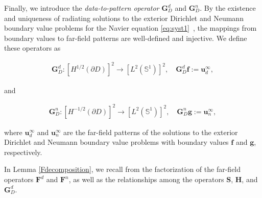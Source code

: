 \documentclass[11pt,reqno,twoside]{amsart}
\theoremstyle{definition}
\theoremstyle{remark}
\numberwithin{equation}{section}
\begin{document}
Finally, we introduce the \emph{data-to-pattern operator} $\mathbf{G}_D^d$ and $\mathbf{G}_D^n$. By the existence and uniqueness of radiating solutions to the exterior Dirichlet and Neumann boundary value problems for the Navier equation \eqref{eq:syst1}~\cite{HH93}, the mappings from boundary values to far-field patterns are well-defined and injective. We define these operators as

\begin{align}\label{eq:DatatoPatternOperatorD}
	\mathbf{G}_D^d : \left[H^{1/2}\left(\partial D\right)\right]^2 \to \left[L^2\left(\mathbb{S}^1\right)\right]^2, \quad \mathbf{G}_D^d \mathbf{f} := \mathbf{u}_d^{\infty},
\end{align}

\noindent and

\begin{align}\label{eq:DatatoPatternOperatorN}
	\mathbf{G}_D^n : \left[H^{-1/2}\left(\partial D\right)\right]^2 \to \left[L^2\left(\mathbb{S}^1\right)\right]^2, \quad \mathbf{G}_D^n \mathbf{g} := \mathbf{u}_n^{\infty},
\end{align}

\noindent where $\mathbf{u}_d^{\infty}$ and $\mathbf{u}_n^{\infty}$ are the far-field patterns of the solutions to the exterior Dirichlet and Neumann boundary value problems with boundary values $\mathbf{f}$ and $\mathbf{g}$, respectively.
 
In Lemma \ref{Fdecomposition}, we  recall from \cite{Aren01,LLW25} the factorization of the far-field operators $\mathbf{F}^d$ and $\mathbf{F}^n$, as well as the relationships among the operators $\mathbf{S}$, $\mathbf{H}$, and $\mathbf{G}_D^d$. 
    
\end{document}
